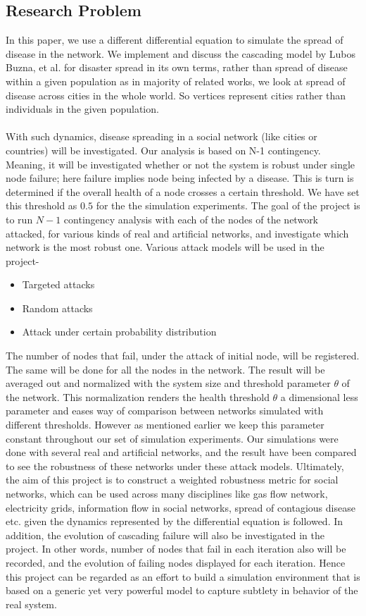 \documentclass[11pt]{article}
\begin{document}
\subsection{Research Problem}
In this paper, we use a different differential equation to simulate the spread of disease in the network. We implement and discuss the cascading model by Lubos Buzna, et al. \cite{helbing} for disaster spread in its own terms, rather than spread of disease within a given population as in majority of related works, we look at spread of disease across cities in the whole world. So vertices represent cities rather than individuals in the given population.\\
\\
With such dynamics, disease spreading in a social network (like cities or countries) will be investigated.  Our analysis is based on N-1 contingency. Meaning, it will be investigated whether or not the system is robust under single node failure; here failure implies node being infected by a disease. This is turn is determined if the overall health of a node crosses a certain threshold. We have set this threshold as $0.5$ for the the simulation experiments. The goal of the project is to run $N-1$ contingency analysis with each of the nodes of the network attacked, for various kinds of real and artificial networks, and investigate which network is the most robust one. Various attack models will be used in the project- 

\begin{itemize}
\item Targeted attacks
\item Random attacks
\item Attack under certain probability distribution
\end{itemize}

 The number of nodes that fail, under the attack of initial node, will be registered. The same will be done for all the nodes in the network. The result will be averaged out and normalized with the system size and threshold parameter $\theta$ of the network. This normalization renders the health threshold $\theta$ a dimensional less parameter and eases way of comparison between networks simulated with different thresholds. However as mentioned earlier we keep this parameter constant throughout our set of simulation experiments. Our simulations were done with several real and artificial networks, and the result have been compared to see the robustness of these networks under these attack models. Ultimately, the aim of this project is to construct a weighted robustness metric for social networks, which can be used across many disciplines like gas flow network, electricity grids, information flow in social networks, spread of contagious disease etc. given the dynamics represented by the differential equation is followed. In addition, the evolution of cascading failure will also be investigated in the project. In other words, number of nodes that fail in each iteration also will be recorded, and the evolution of failing nodes displayed for each iteration. Hence this project can be regarded as an effort to build a simulation environment that is based on a generic yet very powerful model to capture subtlety in behavior of the real system.
\end{document}

